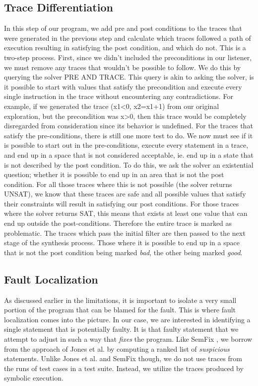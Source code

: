 \documentclass[]{article}
\begin{document}
\subsection{Trace Differentiation}
In this step of our program, we add pre and post conditions to the traces
that were generated in the previous step and calculate which traces followed
a path of execution resulting in satisfying the post condition, and which do
not.  This is a two-step process.  First, since we didn't included the
preconditions in our listener, we must remove any traces that wouldn't be
possible to follow.  We do this by querying the solver PRE AND TRACE.  This
query is akin to asking the solver, is it possible to start with values that
satisfy the precondition and execute every single instruction in the trace
without encountering any contradictions.  For example, if we generated the
trace (x1<0, x2=x1+1) from our original exploration, but the precondition
was x>0, then this trace would be completely disregarded from consideration
since its behavior is undefined.  For the traces that satisfy the
pre-conditions, there is still one more test to do.  We now must see if it
is possible to start out in the pre-conditions, execute every statement in a
trace, and end up in a space that is not considered acceptable, ie. end up
in a state that is not described by the post condition.  To do this, we ask
the solver an existential question; whether it is possible to end up in an
area that is not the post condition.  For all those traces where this is not
possible (the solver returns UNSAT), we know that these traces are safe and
all possible values that satisfy their constraints will result in satisfying
our post conditions.  For those traces where the solver returns SAT, this
means that exists at least one value that can end up outside the
post-conditions.  Therefore the entire trace is marked as problematic.  The
traces which pass the initial filter are then passed to the next stage of
the synthesis process.  Those where it is possible to end up in a space that
is not the post condition being marked \emph{bad}, the other being marked
\emph{good}.

\subsection{Fault Localization}

As discussed earlier in the limitations, it is important to isolate a very
small portion of the program that can be blamed for the fault. This is where
fault localization comes into the picture. In our case, we are interested in
identifying a single statement that is potentially faulty. It is that faulty
statement that we attempt to adjust in such a way that \emph{fixes} the
program. Like SemFix \cite{}, we borrow from the approach of Jones et al.
\cite{JonesTarantula} by computing a ranked list of \emph{suspicious}
statements. Unlike Jones et al. and SemFix though, we do not use traces from
the runs of test cases in a test suite. Instead, we utilize the traces
produced by symbolic execution.
\end{document}
